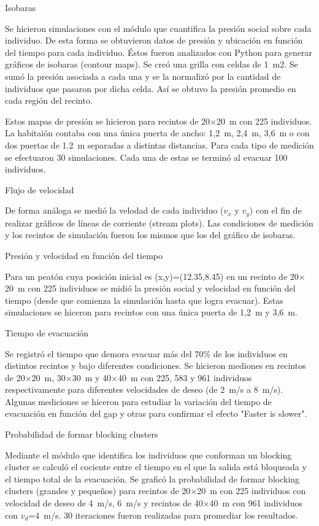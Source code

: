 {\Large Isobaras}

Se hicieron simulaciones con el módulo que cuantifica la presión social sobre cada individuo. De esta forma se obtuvieron datos de presión y ubicación en función del tiempo para cada individuo. Éstos fueron analizados con Python para generar gráficos de isobaras (contour maps).  Se creó una grilla con celdas de 1~m2. Se sumó la presión asociada a cada una y se la normalizó por la cantidad de individuos que pasaron por dicha celda. Así se obtuvo la presión promedio en cada región del recinto.   

Estos mapas de presión se hicieron para recintos de 20$\times$20~m con 225 individuos. La habitaión contaba con una única puerta de ancho: 1,2~m, 2,4~m, 3,6~m o con dos puertas de 1.2~m separadas a distintas distancias. Para cada tipo de medición se efectuaron 30 simulaciones. Cada una de estas se terminó al evacuar 100 individuos. 

{\Large Flujo de velocidad}

De forma análoga se medió la velodad de cada individuo ($v_x$ y $v_y$) con el fin de realizar gráficos de líneas de corriente (stream plots). Las condiciones de medición y los recintos de simulación fueron los mismos que los del gráfico de isobaras. 

{\Large Presión y velocidad en función del tiempo}

Para un peatón cuya posición inicial es (x,y)=(12.35,8.45) en un recinto de 20$\times$20~m con 225 individuos se midió la presión social y velocidad en función del tiempo (desde que comienza la simulación hasta que logra evacuar). Estas simulaciones se hiceron para recintos con una única puerta de 1,2~m y 3,6~m. 

{\Large Tiempo de evacuación}

Se registró el tiempo que demora evacuar más del 70\% de los individuos en distintos recintos y bajo diferentes condiciones. Se hicieron mediones en recintos de 20$\times$20~m, 30$\times$30~m y 40$\times$40~m con 225, 583 y 961 individuos respectivamente para diferentes velocidades de deseo (de 2~m/s a 8~m/s). Algunas mediciones se hiceron para estudiar la variación del tiempo de evacuación en función del gap y otras para confirmar el efecto "Faster is slower". 

{\Large Probabilidad de formar blocking clusters}

Mediante el módulo que identifica los individuos que conforman un blocking cluster se calculó el cociente entre el tiempo en el que la salida está bloqueada y el tiempo total de la evacuación. Se graficó la probabilidad de formar blocking clusters (grandes y pequeños) para recintos de 20$\times$20~m con 225 individuos con velocidad de deseo de 4~m/s, 6~m/s y recintos de 40$\times$40~m con 961 individuos con $v_d$=4~m/s. 30 iteraciones fueron realizadas para promediar los resultados. 

